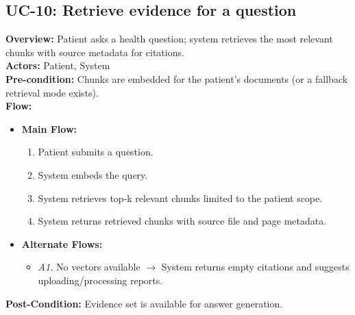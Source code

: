 \documentclass[12pt, a4paper]{article}
\begin{document}
\subsection*{UC-10: Retrieve evidence for a question}
\textbf{Overview:} Patient asks a health question; system retrieves the most relevant chunks with source metadata for citations. \\
\textbf{Actors:} Patient, System \\
\textbf{Pre-condition:} Chunks are embedded for the patient’s documents (or a fallback retrieval mode exists). \\
\textbf{Flow:}
\begin{itemize}[leftmargin=*]
    \item \textbf{Main Flow:}
    \begin{enumerate}
        \item Patient submits a question.
        \item System embeds the query.
        \item System retrieves top-k relevant chunks limited to the patient scope.
        \item System returns retrieved chunks with source file and page metadata.
    \end{enumerate}
    \item \textbf{Alternate Flows:}
    \begin{itemize}
        \item \textit{A1.} No vectors available $\rightarrow$ System returns empty citations and suggests uploading/processing reports.
    \end{itemize}
\end{itemize}
\textbf{Post-Condition:} Evidence set is available for answer generation.
\end{document}
